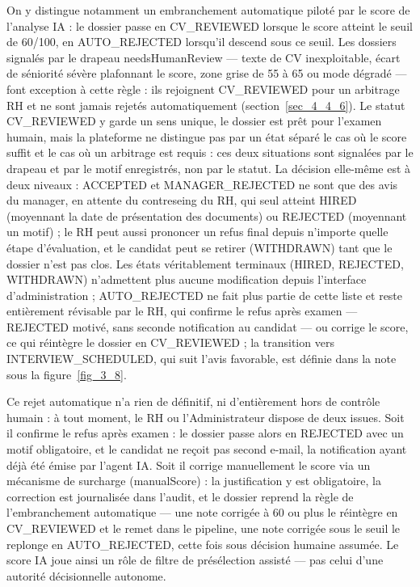 On y distingue notamment un embranchement automatique piloté par le score de l’analyse IA : le dossier passe en CV\_REVIEWED lorsque le score atteint le seuil de 60/100, en AUTO\_REJECTED lorsqu’il descend sous ce seuil. Les dossiers signalés par le drapeau needs\-Human\-Review — texte de CV inexploitable, écart de séniorité sévère plafonnant le score, zone grise de 55 à 65 ou mode dégradé — font exception à cette règle : ils rejoignent CV\_REVIEWED pour un arbitrage RH et ne sont jamais rejetés automatiquement (section~\ref{sec_4_4_6}). Le statut CV\_REVIEWED y garde un sens unique, le dossier est prêt pour l’examen humain, mais la plateforme ne distingue pas par un état séparé le cas où le score suffit et le cas où un arbitrage est requis : ces deux situations sont signalées par le drapeau et par le motif enregistrés, non par le statut. La décision elle-même est à deux niveaux : ACCEPTED et MANAGER\_REJECTED ne sont que des avis du manager, en attente du contreseing du RH, qui seul atteint HIRED (moyennant la date de présentation des documents) ou REJECTED (moyennant un motif) ; le RH peut aussi prononcer un refus final depuis n’importe quelle étape d’évaluation, et le candidat peut se retirer (WITHDRAWN) tant que le dossier n’est pas clos. Les états véritablement terminaux (HIRED, REJECTED, WITHDRAWN) n’admettent plus aucune modification depuis l’interface d’administration ; AUTO\_REJECTED ne fait plus partie de cette liste et reste entièrement révisable par le RH, qui confirme le refus après examen — REJECTED motivé, sans seconde notification au candidat — ou corrige le score, ce qui réintègre le dossier en CV\_REVIEWED ; la transition vers INTERVIEW\_SCHEDULED, qui suit l’avis favorable, est définie dans la note sous la figure~\ref{fig_3_8}.

Ce rejet automatique n’a rien de définitif, ni d’entièrement hors de contrôle humain : à tout moment, le RH ou l’Administrateur dispose de deux issues. Soit il confirme le refus après examen : le dossier passe alors en REJECTED avec un motif obligatoire, et le candidat ne reçoit pas second e-mail, la notification ayant déjà été émise par l’agent IA. Soit il corrige manuellement le score via un mécanisme de surcharge (manualScore) : la justification y est obligatoire, la correction est journalisée dans l’audit, et le dossier reprend la règle de l’embranchement automatique — une note corrigée à 60 ou plus le réintègre en CV\_REVIEWED et le remet dans le pipeline, une note corrigée sous le seuil le replonge en AUTO\_REJECTED, cette fois sous décision humaine assumée. Le score IA joue ainsi un rôle de filtre de présélection assisté — pas celui d’une autorité décisionnelle autonome.

